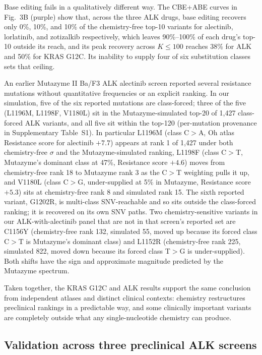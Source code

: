 \documentclass[11pt,a4paper]{article}
\begin{document}
Base editing fails in a qualitatively different way. The CBE+ABE curves
in Fig.~3B (purple) show that, across the three ALK drugs, base editing
recovers only 0\%, 10\%, and 10\% of the chemistry-free top-10 variants
for alectinib, lorlatinib, and zotizalkib respectively, which leaves
90\%--100\% of each drug's top-10 outside its reach, and its peak
recovery across $K \leq 100$ reaches 38\% for ALK and 50\% for KRAS
G12C. Its inability to supply four of six substitution classes sets
that ceiling.

An earlier Mutazyme II Ba/F3 ALK alectinib screen \citep{doi2022}
reported several resistance mutations without quantitative frequencies
or an explicit ranking. In our simulation, five of the six reported
mutations are class-forced; three of the five (L1196M, L1198F, V1180L)
sit in the Mutazyme-simulated top-20 of 1,427 class-forced ALK
variants, and all five sit within the top-120 (per-mutation provenance
in Supplementary Table~S1). In particular L1196M (class C$>$A, Oh
atlas Resistance score for alectinib $+7.7$) appears at rank 1 of
1,427 under both chemistry-free $\sigma$ and the Mutazyme-simulated
ranking, L1198F (class C$>$T, Mutazyme's dominant class at 47\%,
Resistance score $+4.6$) moves from chemistry-free rank 18 to Mutazyme
rank 3 as the C$>$T weighting pulls it up, and V1180L (class C$>$G,
under-supplied at 5\% in Mutazyme, Resistance score $+5.3$) sits at
chemistry-free rank 8 and simulated rank 15.
The sixth reported variant, G1202R, is multi-class SNV-reachable and
so sits outside the class-forced ranking; it is recovered on its own
SNV paths. Two chemistry-sensitive variants in our
ALK-with-alectinib panel that are not in that screen's reported set
are C1156Y (chemistry-free rank 132, simulated 55, moved up because
its forced class C$>$T is Mutazyme's dominant class) and
L1152R (chemistry-free rank 225, simulated 822, moved down because
its forced class T$>$G is under-supplied). Both shifts have the sign
and approximate magnitude predicted by the Mutazyme spectrum.

Taken together, the KRAS G12C and ALK results support the same
conclusion from independent atlases and distinct clinical contexts:
chemistry restructures preclinical rankings in a predictable way,
and some clinically important variants are completely outside what
any single-nucleotide chemistry can produce.

\subsection{Validation across three preclinical ALK screens}
\label{sec:retrospective}
\end{document}
